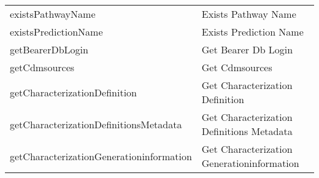\documentclass[
]{article}
\begin{document}
\begin{longtable}[]{@{}ll@{}}
\begin{minipage}[t]{0.46\columnwidth}\raggedright
existsPathwayName\strut
\end{minipage} & \begin{minipage}[t]{0.48\columnwidth}\raggedright
Exists Pathway Name\strut
\end{minipage}\tabularnewline
\begin{minipage}[t]{0.46\columnwidth}\raggedright
existsPredictionName\strut
\end{minipage} & \begin{minipage}[t]{0.48\columnwidth}\raggedright
Exists Prediction Name\strut
\end{minipage}\tabularnewline
\begin{minipage}[t]{0.46\columnwidth}\raggedright
getBearerDbLogin\strut
\end{minipage} & \begin{minipage}[t]{0.48\columnwidth}\raggedright
Get Bearer Db Login\strut
\end{minipage}\tabularnewline
\begin{minipage}[t]{0.46\columnwidth}\raggedright
getCdmsources\strut
\end{minipage} & \begin{minipage}[t]{0.48\columnwidth}\raggedright
Get Cdmsources\strut
\end{minipage}\tabularnewline
\begin{minipage}[t]{0.46\columnwidth}\raggedright
getCharacterizationDefinition\strut
\end{minipage} & \begin{minipage}[t]{0.48\columnwidth}\raggedright
Get Characterization Definition\strut
\end{minipage}\tabularnewline
\begin{minipage}[t]{0.46\columnwidth}\raggedright
getCharacterizationDefinitionsMetadata\strut
\end{minipage} & \begin{minipage}[t]{0.48\columnwidth}\raggedright
Get Characterization Definitions Metadata\strut
\end{minipage}\tabularnewline
\begin{minipage}[t]{0.46\columnwidth}\raggedright
getCharacterizationGenerationinformation\strut
\end{minipage} & \begin{minipage}[t]{0.48\columnwidth}\raggedright
Get Characterization Generationinformation\strut
\end{minipage}\tabularnewline

\end{longtable}
\end{document}
